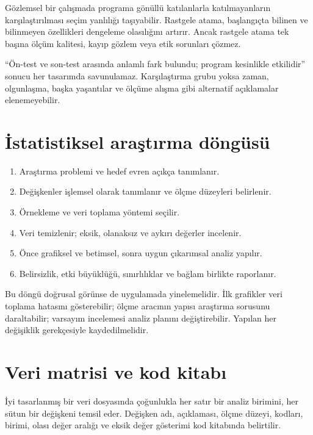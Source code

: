 Gözlemsel bir çalışmada programa gönüllü katılanlarla katılmayanların
karşılaştırılması seçim yanlılığı taşıyabilir. Rastgele atama, başlangıçta
bilinen ve bilinmeyen özellikleri dengeleme olasılığını artırır. Ancak rastgele
atama tek başına ölçüm kalitesi, kayıp gözlem veya etik sorunları çözmez.

\begin{mistakebox}
``Ön-test ve son-test arasında anlamlı fark bulundu; program kesinlikle
etkilidir'' sonucu her tasarımda savunulamaz. Karşılaştırma grubu yoksa zaman,
olgunlaşma, başka yaşantılar ve ölçüme alışma gibi alternatif açıklamalar
elenemeyebilir.
\end{mistakebox}

\section{İstatistiksel araştırma döngüsü}

\begin{enumerate}
  \item Araştırma problemi ve hedef evren açıkça tanımlanır.
  \item Değişkenler işlemsel olarak tanımlanır ve ölçme düzeyleri belirlenir.
  \item Örnekleme ve veri toplama yöntemi seçilir.
  \item Veri temizlenir; eksik, olanaksız ve aykırı değerler incelenir.
  \item Önce grafiksel ve betimsel, sonra uygun çıkarımsal analiz yapılır.
  \item Belirsizlik, etki büyüklüğü, sınırlılıklar ve bağlam birlikte raporlanır.
\end{enumerate}

Bu döngü doğrusal görünse de uygulamada yinelemelidir. İlk grafikler veri
toplama hatasını gösterebilir; ölçme aracının yapısı araştırma sorusunu
daraltabilir; varsayım incelemesi analiz planını değiştirebilir. Yapılan her
değişiklik gerekçesiyle kaydedilmelidir.

\section{Veri matrisi ve kod kitabı}

İyi tasarlanmış bir veri dosyasında çoğunlukla her satır bir analiz birimini,
her sütun bir değişkeni temsil eder. Değişken adı, açıklaması, ölçme düzeyi,
kodları, birimi, olası değer aralığı ve eksik değer gösterimi kod kitabında
belirtilir.

